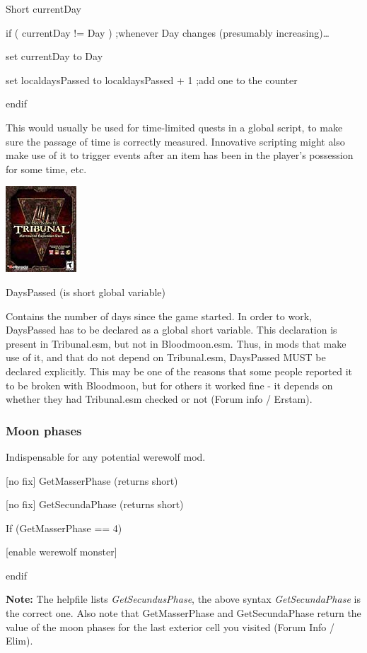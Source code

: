 Short currentDay

if ( currentDay != Day ) ;whenever Day changes (presumably
increasing)\ldots{}

set currentDay to Day

set localdaysPassed to localdaysPassed + 1 ;add one to the counter

endif

This would usually be used for time-limited quests in a global script,
to make sure the passage of time is correctly measured. Innovative
scripting might also make use of it to trigger events after an item has
been in the player's possession for some time, etc.

\includegraphics{media/image6.png}

DaysPassed (is short global variable)

Contains the number of days since the game started. In order to work,
DaysPassed has to be declared as a global short variable. This
declaration is present in Tribunal.esm, but not in Bloodmoon.esm. Thus,
in mods that make use of it, and that do not depend on Tribunal.esm,
DaysPassed MUST be declared explicitly. This may be one of the reasons
that some people reported it to be broken with Bloodmoon, but for others
it worked fine - it depends on whether they had Tribunal.esm checked or
not (Forum info / Erstam).

\hypertarget{moon-phases}{%
\subsubsection{Moon phases}\label{moon-phases}}

Indispensable for any potential werewolf mod.

{[}no fix{]} GetMasserPhase (returns short)

{[}no fix{]} GetSecundaPhase (returns short)

If (GetMasserPhase == 4)

{[}enable werewolf monster{]}

endif

\textbf{Note:} The helpfile lists \emph{GetSecundusPhase}, the above
syntax \emph{GetSecundaPhase} is the correct one. Also note that
GetMasserPhase and GetSecundaPhase return the value of the moon phases
for the last exterior cell you visited (Forum Info / Elim).

